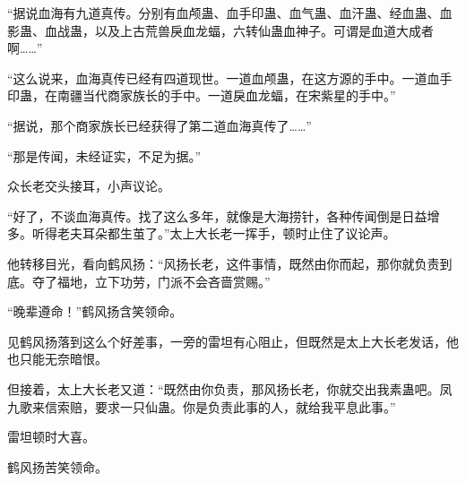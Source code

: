 \begin{this_body}
“据说血海有九道真传。分别有血颅蛊、血手印蛊、血气蛊、血汗蛊、经血蛊、血影蛊、血战蛊，以及上古荒兽戾血龙蝠，六转仙蛊血神子。可谓是血道大成者啊……”

“这么说来，血海真传已经有四道现世。一道血颅蛊，在这方源的手中。一道血手印蛊，在南疆当代商家族长的手中。一道戾血龙蝠，在宋紫星的手中。”

“据说，那个商家族长已经获得了第二道血海真传了……”

“那是传闻，未经证实，不足为据。”

众长老交头接耳，小声议论。

“好了，不谈血海真传。找了这么多年，就像是大海捞针，各种传闻倒是日益增多。听得老夫耳朵都生茧了。”太上大长老一挥手，顿时止住了议论声。

他转移目光，看向鹤风扬：“风扬长老，这件事情，既然由你而起，那你就负责到底。夺了福地，立下功劳，门派不会吝啬赏赐。”

“晚辈遵命！”鹤风扬含笑领命。

见鹤风扬落到这么个好差事，一旁的雷坦有心阻止，但既然是太上大长老发话，他也只能无奈暗恨。

但接着，太上大长老又道：“既然由你负责，那风扬长老，你就交出我素蛊吧。凤九歌来信索赔，要求一只仙蛊。你是负责此事的人，就给我平息此事。”

雷坦顿时大喜。

鹤风扬苦笑领命。

\end{this_body}

